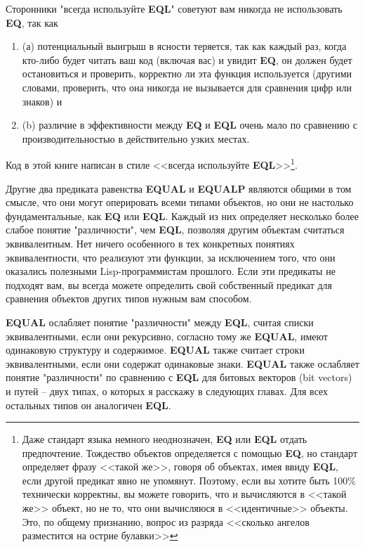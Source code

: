Сторонники "всегда используйте \textbf{EQL}" советуют вам никогда не использовать
\textbf{EQ}, так как

\begin{enumerate}
\item (а) потенциальный выигрыш в ясности теряется, так как каждый раз, когда кто-либо
  будет читать ваш код (включая вас) и увидит \textbf{EQ}, он должен будет остановиться и
  проверить, корректно ли эта функция используется (другими словами, проверить, что она
  никогда не вызывается для сравнения цифр или знаков) и
\item (b) различие в эффективности между \textbf{EQ} и \textbf{EQL} очень мало по
  сравнению с производительностью в действительно узких местах.
\end{enumerate}

Код в этой книге написан в стиле <<всегда используйте \textbf{EQL}>>\footnote{Даже стандарт
  языка немного неоднозначен, \textbf{EQ} или \textbf{EQL} отдать предпочтение. Тождество
  объектов определяется с помощью \textbf{EQ}, но стандарт определяет фразу <<такой же>>,
  говоря об объектах, имея ввиду \textbf{EQL}, если другой предикат явно не
  упомянут. Поэтому, если вы хотите быть 100\% технически корректны, вы можете говорить,
  что  и  вычисляются в <<такой же>> объект, но не то, что они
  вычисляюся в <<идентичные>> объекты. Это, по общему признанию, вопрос из разряда <<сколько
  ангелов разместится на острие булавки>>}.

Другие два предиката равенства \textbf{EQUAL} и \textbf{EQUALP} являются общими в том
смысле, что они могут оперировать всеми типами объектов, но они не настолько
фундаментальные, как \textbf{EQ} или \textbf{EQL}. Каждый из них определяет несколько
более слабое понятие "различности", чем \textbf{EQL}, позволяя другим объектам считаться
эквивалентным. Нет ничего особенного в тех конкретных понятиях эквивалентности, что
реализуют эти функции, за исключением того, что они оказались полезными Lisp-программистам
прошлого. Если эти предикаты не подходят вам, вы всегда можете определить свой собственный
предикат для сравнения объектов других типов нужным вам способом.

\textbf{EQUAL} ослабляет понятие "различности" между \textbf{EQL}, считая списки
эквивалентными, если они рекурсивно, согласно тому же \textbf{EQUAL}, имеют одинаковую
структуру и содержимое. \textbf{EQUAL} также считает строки эквивалентными, если они
содержат одинаковые знаки. \textbf{EQUAL} также ослабляет понятие "различности" по
сравнению с \textbf{EQL} для битовых векторов (bit vectors) и путей -- двух типах, о
которых я расскажу в следующих главах. Для всех остальных типов он аналогичен
\textbf{EQL}.


